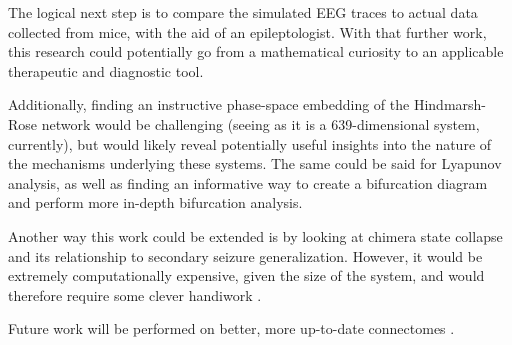 The logical next step is to compare the simulated EEG traces to actual data collected from mice, with the aid of an epileptologist.
With that further work, this research could potentially go from a mathematical curiosity to an applicable therapeutic and diagnostic tool.

Additionally, finding an instructive phase-space embedding of the Hindmarsh-Rose network would be challenging (seeing as it is a 639-dimensional system, currently),
but would likely reveal potentially useful insights into the nature of the mechanisms underlying these systems.
The same could be said for Lyapunov analysis, as well as finding an informative way to create a bifurcation diagram and perform more in-depth bifurcation analysis.

Another way this work could be extended is by looking at chimera state collapse and its relationship to secondary seizure generalization.
However, it would be extremely computationally expensive, given the size of the system, and would therefore require some clever handiwork \cite{Wolfrum2011}.

Future work will be performed on better, more up-to-date connectomes \cite{Knox2019}.
